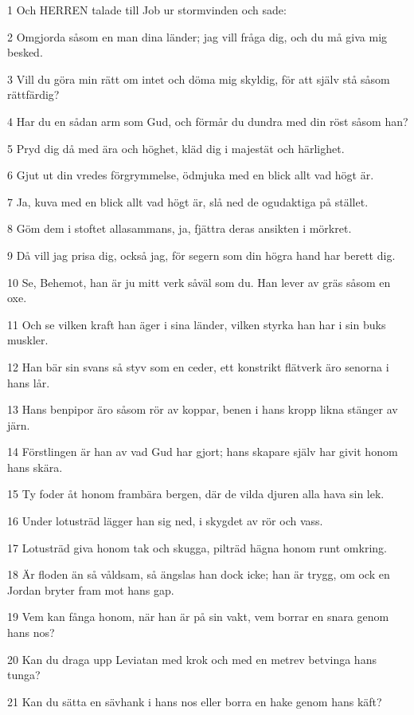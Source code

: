 \par 1 Och HERREN talade till Job ur stormvinden och sade:
\par 2 Omgjorda såsom en man dina länder; jag vill fråga dig, och du må giva mig besked.
\par 3 Vill du göra min rätt om intet och döma mig skyldig, för att själv stå såsom rättfärdig?
\par 4 Har du en sådan arm som Gud, och förmår du dundra med din röst såsom han?
\par 5 Pryd dig då med ära och höghet, kläd dig i majestät och härlighet.
\par 6 Gjut ut din vredes förgrymmelse, ödmjuka med en blick allt vad högt är.
\par 7 Ja, kuva med en blick allt vad högt är, slå ned de ogudaktiga på stället.
\par 8 Göm dem i stoftet allasammans, ja, fjättra deras ansikten i mörkret.
\par 9 Då vill jag prisa dig, också jag, för segern som din högra hand har berett dig.
\par 10 Se, Behemot, han är ju mitt verk såväl som du. Han lever av gräs såsom en oxe.
\par 11 Och se vilken kraft han äger i sina länder, vilken styrka han har i sin buks muskler.
\par 12 Han bär sin svans så styv som en ceder, ett konstrikt flätverk äro senorna i hans lår.
\par 13 Hans benpipor äro såsom rör av koppar, benen i hans kropp likna stänger av järn.
\par 14 Förstlingen är han av vad Gud har gjort; hans skapare själv har givit honom hans skära.
\par 15 Ty foder åt honom frambära bergen, där de vilda djuren alla hava sin lek.
\par 16 Under lotusträd lägger han sig ned, i skygdet av rör och vass.
\par 17 Lotusträd giva honom tak och skugga, pilträd hägna honom runt omkring.
\par 18 Är floden än så våldsam, så ängslas han dock icke; han är trygg, om ock en Jordan bryter fram mot hans gap.
\par 19 Vem kan fånga honom, när han är på sin vakt, vem borrar en snara genom hans nos?
\par 20 Kan du draga upp Leviatan med krok och med en metrev betvinga hans tunga?
\par 21 Kan du sätta en sävhank i hans nos eller borra en hake genom hans käft?
